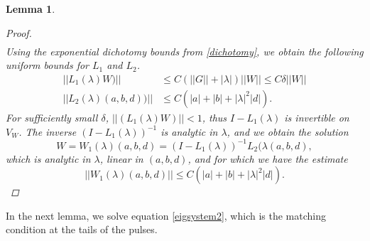 \documentclass[12pt]{elsarticle}
\newtheorem{lemma}{Lemma}
\begin{document}
\begin{lemma}
\begin{proof}
\begin{align*}
\end{align*}
Using the exponential dichotomy bounds from \cref{dichotomy}, we obtain the following uniform bounds for $L_1$ and $L_2$.
\begin{align*}
||L_1(\lambda)W)|| &\leq C \left(||G|| + |\lambda| \right)||W|| \leq C \delta ||W|| \\
||L_2(\lambda)(a,b,d))|| &\leq C\left( |a| + |b| + |\lambda|^2 |d| \right).
\end{align*}
For sufficiently small $\delta$, $||(L_1(\lambda)W)|| < 1$, thus $I - L_1(\lambda)$ is invertible on $V_W$. The inverse $(I - L_1(\lambda))^{-1}$ is analytic in $\lambda$, and we obtain the solution 
\[
W = W_1(\lambda)(a,b,d) = (I - L_1(\lambda))^{-1} L_2(\lambda(a,b,d),
\]
which is analytic in $\lambda$, linear in $(a, b, d)$, and for which we have the estimate
\begin{equation*}
||W_1(\lambda)(a,b,d)|| \leq C \left( |a| + |b| + |\lambda|^2 |d| \right).
\end{equation*}
\end{proof}
\end{lemma}

In the next lemma, we solve equation \cref{eigsystem2}, which is the matching condition at the tails of the pulses.
\end{document}
